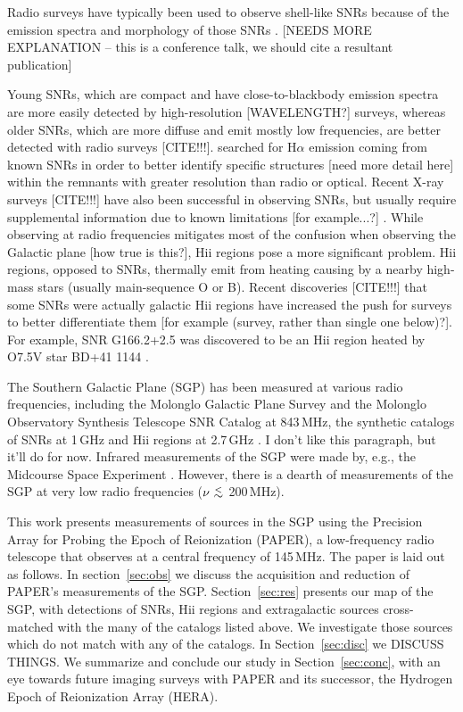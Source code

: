 \documentclass[useAMS,usenatbib]{mn2e}
\newcommand {\aplt} {\ {\raise-.5ex\hbox{$\buildrel<\over\sim$}}\ }
\begin{document}
Radio surveys have typically been used to observe shell-like SNRs %
because of the emission spectra and morphology of those SNRs \citep{Bandiera.01}.  {\color{red}[NEEDS MORE EXPLANATION -- this is a conference talk, we should cite a resultant publication]}

Young SNRs, which are compact and have close-to-blackbody emission spectra are more easily detected by high-resolution {\color{red}[WAVELENGTH?]} surveys, whereas older SNRs, which are more diffuse and emit mostly low frequencies, are better detected with radio surveys {\color{red}[CITE!!!]}. \cite{Stupar_cat.11} searched for H$\alpha$ emission coming from known SNRs in order to better identify specific structures {\color{red}[need more detail here]} within the remnants with greater resolution than radio or optical.  Recent X-ray surveys {\color{red}[CITE!!!]} have also been successful in observing SNRs, but usually require supplemental information due to known limitations {\color{red}[for example...?]} \citep{Bandiera.01}. While observing at radio frequencies mitigates most of the confusion when observing the Galactic plane {\color{red}[how true is this?]}, H{\sc ii} regions pose a more significant problem.  H{\sc ii} regions, opposed to SNRs, thermally emit from heating causing by a nearby high-mass stars (usually main-sequence O or B).  Recent discoveries {\color{red}[CITE!!!]} that some SNRs were actually galactic H{\sc ii} regions have increased the push for surveys to better differentiate them {\color{red}[for example (survey, rather than single one below)?]}.  For example, SNR G166.2+2.5 was discovered to be an H{\sc ii} region heated by O7.5V star BD+41 1144 \citep{Foster.06}.  

The Southern Galactic Plane (SGP) has been measured at various radio frequencies, including the Molonglo Galactic Plane Survey \citep[MGPS][]{Murphy.07} and the Molonglo Observatory Synthesis Telescope SNR Catalog \citep[MOSTSNRCAT][]{Whiteoak.96} at 843\,MHz, the synthetic catalogs of SNRs at 1\,GHz \citep{DAGreen.14} and H{\sc ii} regions at 2.7\,GHz \citep{Paladini.03}. {\color{red} I don't like this paragraph, but it'll do for now.} Infrared measurements of the SGP were made by, e.g., the Midcourse Space Experiment \citep[MSX][operating at 8.28--21.3\,$\mu$m (36.23--14.08\,THz)]{Egan.03}. However, there is a dearth of measurements of the SGP at very low radio frequencies ($\nu\aplt$200\,MHz).

This work presents measurements of sources in the SGP using the Precision Array for Probing the Epoch of Reionization (PAPER), a low-frequency radio telescope that observes at a central frequency of 145\,MHz. The paper is laid out as follows. In section~\ref{sec:obs} we discuss the acquisition and reduction of PAPER's measurements of the SGP. Section~\ref{sec:res} presents our map of the SGP, with detections of SNRs, H{\sc ii} regions and extragalactic sources cross-matched with the many of the catalogs listed above. We investigate those sources which do not match with any of the catalogs. In Section~\ref{sec:disc} we {\color{red} DISCUSS THINGS}. We summarize and conclude our study in Section~\ref{sec:conc}, with an eye towards future imaging surveys with PAPER and its successor, the Hydrogen Epoch of Reionization Array (HERA).
\end{document}
